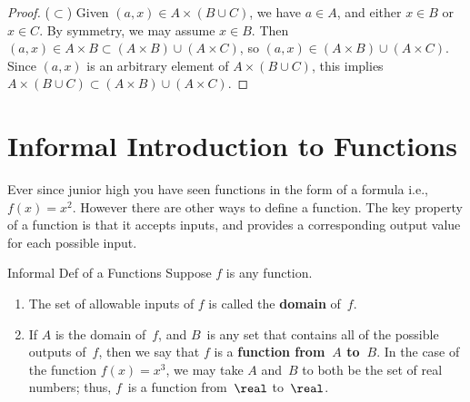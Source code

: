 \documentclass[../MATH-2000-Notes.tex]{subfiles}
\begin{document}
\begin{Answers}
\begin{proof}
        ($\subset$) Given $(a,x) \in A \times (B \cup C)$, we have $a \in A$, and either $x \in B$ or $x \in C$. By symmetry, we may assume $x \in B$. Then $(a,x) \in A \times B \subset (A \times B) \cup (A \times C)$, so $(a,x) \in (A \times B) \cup (A \times C)$.
        Since $(a,x)$ is an arbitrary element of $A \times (B \cup C)$, this implies $A \times (B \cup C) \subset (A \times B) \cup (A \times C)$.
    \end{proof}
\end{Answers}

\section{Informal Introduction to Functions}
Ever since junior high you have seen functions in the form of a formula i.e., \(f(x)  = x^2\). However there are other ways to define a function. The key property of a function is that it accepts inputs, and provides a corresponding output value for each possible input.

\begin{Definition}
    {Informal Def of a Functions}
    Suppose $f$ is any function.
    \begin{enumerate}
        \item The set of allowable inputs of $f$ is called the \textbf{domain} of~$f$.
        \item If $A$ is the domain of~$f$, and $B$~is any set that contains all of the possible outputs of~$f$, then we say that $f$ is a \textbf{function from~$A$ to~$B$}. In the case of the function $f(x) = x^3$, we may take $A$ and~$B$ to both be the set of real numbers; thus, $f$~is a function from~$\real$ to~$\real$.
    \end{enumerate}
\end{Definition}
\end{document}
